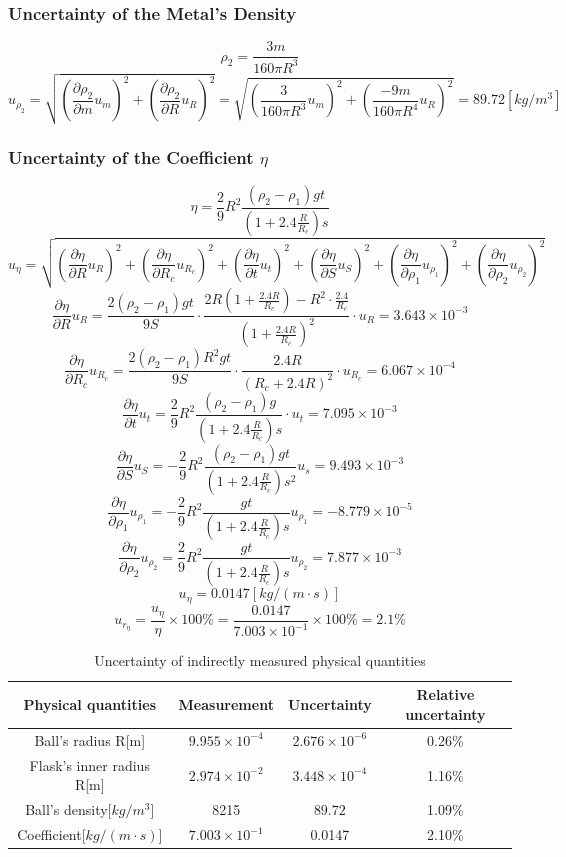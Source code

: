 \documentclass[12pt]{article}
\begin{document}
\subsubsection{Uncertainty of the Metal's Density}
$$\rho_2=\frac{3m}{160\pi R^3}$$
$$u_{\rho_2}=\sqrt{(\frac{\partial{\rho_2}}{\partial{m}}u_m)^2+(\frac{\partial{\rho_2}}{\partial{R}}u_R)^2}=\sqrt{(\frac{3}{160\pi{R^3}}u_m)^2+(\frac{-9m}{160\pi{R^4}}u_R)^2}=89.72[kg/m^3]$$
\subsubsection{Uncertainty of the Coefficient $\eta$}
$$\eta=\frac{2}{9}R^2\frac{(\rho_2-\rho_1)gt}{(1+2.4\frac{R}{R_c})s}$$
$$u_{\eta}=\sqrt{(\frac{\partial{\eta}}{\partial{R}}u_R)^2+(\frac{\partial{\eta}}{\partial{R_c}}u_{R_c})^2+(\frac{\partial{\eta}}{\partial{t}}u_t)^2+(\frac{\partial{\eta}}{\partial{S}}u_S)^2+(\frac{\partial{\eta}}{\partial{\rho_1}}u_{\rho_1})^2+(\frac{\partial{\eta}}{\partial{\rho_2}}u_{\rho_2})^2}$$
$$\frac{\partial{\eta}}{\partial{R}}u_R=\frac{2(\rho_2-\rho_1)gt}{9S}\cdot\frac{2R(1+\frac{2.4R}{R_c})-R^2\cdot\frac{2.4}{R_c}}{(1+\frac{2.4R}{R_c})^2}\cdot{u_R}=3.643\times10^{-3}$$
$$\frac{\partial{\eta}}{\partial{R_c}}u_{R_c}=\frac{2(\rho_2-\rho_1)R^2gt}{9S}\cdot\frac{2.4R}{(R_c+2.4R)^2}\cdot{u_{R_c}}=6.067\times10^{-4}$$
$$\frac{\partial{\eta}}{\partial{t}}u_{t}=\frac{2}{9}R^2\frac{(\rho_2-\rho_1)g}{(1+2.4\frac{R}{R_c})s}\cdot{u_t}=7.095\times10^{-3}$$
$$\frac{\partial{\eta}}{\partial{S}}u_S=-\frac{2}{9}R^2\frac{(\rho_2-\rho_1)gt}{(1+2.4\frac{R}{R_c})s^2}u_s=9.493\times10^{-3}$$
$$\frac{\partial{\eta}}{\partial{\rho_1}}u_{\rho_1}=-\frac{2}{9}R^2\frac{gt}{(1+2.4\frac{R}{R_c})s}u_{\rho_1}=-8.779\times10^{-5}$$
$$\frac{\partial{\eta}}{\partial{\rho_2}}u_{\rho_2}=\frac{2}{9}R^2\frac{gt}{(1+2.4\frac{R}{R_c})s}u_{\rho_2}=7.877\times10^{-3}$$
$$u_{\eta}=0.0147[kg/(m\cdot{s})]$$
$$u_{r_{\eta}}=\frac{u_{\eta}}{\eta}\times100\%=\frac{0.0147}{7.003\times10^{-1}}\times100\%=2.1\%$$
\begin{table}[H]
\centering
\begin{tabular}{|c|c|c|c|}
\hline
Physical quantities    & Measurement & Uncertainty & Relative uncertainty \\ \hline
Ball's radius R[m]       &    $9.955\times10^{-4}$         &   $2.676\times10^{-6}$          & 0.26\%                     \\ \hline
Flask's inner radius R[m] & $2.974\times10^{-2}$            &    $3.448\times10^{-4}$         & 1.16\%                     \\ \hline
Ball's density[$kg/m^3$]         &    8215         &   $89.72$          &                     1.09\% \\ \hline
Coefficient[$kg/(m\cdot{s})$]            &   $7.003\times10^{-1}$          &            0.0147 &   2.10\%                   \\ \hline
\end{tabular}
\caption{Uncertainty of indirectly measured physical quantities}
\end{table}
\end{document}
